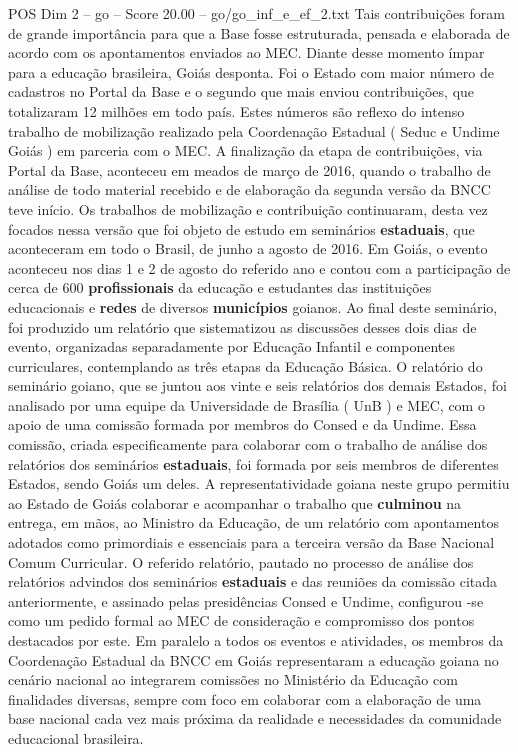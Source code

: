 \begin{textsample}{POS Dim 2 – go – Score 20.00 – go/go\_inf\_e\_ef\_2.txt}
Tais contribuições foram de grande importância para que a Base fosse estruturada, pensada e elaborada de acordo com os apontamentos enviados ao MEC.
Diante desse momento ímpar para a educação brasileira, Goiás desponta.
Foi o Estado com maior número de cadastros no Portal da Base e o segundo que mais enviou contribuições, que totalizaram 12 milhões em todo país.
Estes números são reflexo do intenso trabalho de mobilização realizado pela Coordenação Estadual ( Seduc e Undime Goiás ) em parceria com o MEC.
A finalização da etapa de contribuições, via Portal da Base, aconteceu em meados de março de 2016, quando o trabalho de análise de todo material recebido e de elaboração da segunda versão da BNCC teve início.
Os trabalhos de mobilização e contribuição continuaram, desta vez focados nessa versão que foi objeto de estudo em seminários \textbf{estaduais}, que aconteceram em todo o Brasil, de junho a agosto de 2016.
Em Goiás, o evento aconteceu nos dias 1 e 2 de agosto do referido ano e contou com a participação de cerca de 600 \textbf{profissionais} da educação e estudantes das instituições educacionais e \textbf{redes} de diversos \textbf{municípios} goianos.
Ao final deste seminário, foi produzido um relatório que sistematizou as discussões desses dois dias de evento, organizadas separadamente por Educação Infantil e componentes curriculares, contemplando as três etapas da Educação Básica.
O relatório do seminário goiano, que se juntou aos vinte e seis relatórios dos demais Estados, foi analisado por uma equipe da Universidade de Brasília ( UnB ) e MEC, com o apoio de uma comissão formada por membros do Consed e da Undime.
Essa comissão, criada especificamente para colaborar com o trabalho de análise dos relatórios dos seminários \textbf{estaduais}, foi formada por seis membros de diferentes Estados, sendo Goiás um deles.
A representatividade goiana neste grupo permitiu ao Estado de Goiás colaborar e acompanhar o trabalho que \textbf{culminou} na entrega, em mãos, ao Ministro da Educação, de um relatório com apontamentos adotados como primordiais e essenciais para a terceira versão da Base Nacional Comum Curricular.
O referido relatório, pautado no processo de análise dos relatórios advindos dos seminários \textbf{estaduais} e das reuniões da comissão citada anteriormente, e assinado pelas presidências Consed e Undime, configurou -se como um pedido formal ao MEC de consideração e compromisso dos pontos destacados por este.
Em paralelo a todos os eventos e atividades, os membros da Coordenação Estadual da BNCC em Goiás representaram a educação goiana no cenário nacional ao integrarem comissões no Ministério da Educação com finalidades diversas, sempre com foco em colaborar com a elaboração de uma base nacional cada vez mais próxima da realidade e necessidades da comunidade educacional brasileira.

\end{textsample}
